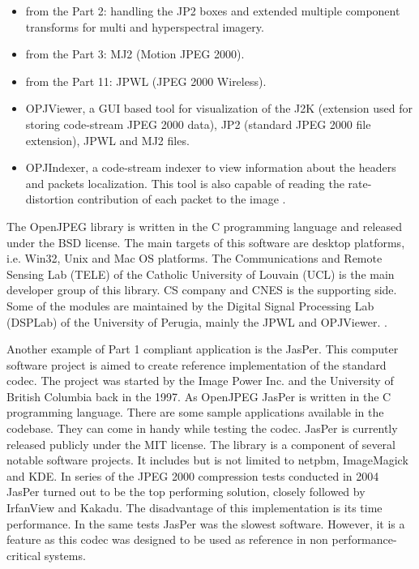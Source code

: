 \begin{itemize}
    \item from the Part 2: handling the JP2 boxes and extended multiple component
    transforms for multi and hyperspectral imagery.
    \item from the Part 3: MJ2 (Motion JPEG 2000).
    \item from the Part 11: JPWL (JPEG 2000 Wireless).
    \item OPJViewer, a GUI based tool for visualization of the J2K (extension used for storing
    code-stream JPEG 2000 data), JP2 (standard JPEG 2000 file extension), JPWL and MJ2 files.
    \item OPJIndexer, a code-stream indexer to view information about the headers and packets localization.
    This tool is also capable of reading the rate-distortion contribution of each packet to the image \cite{jpeg_suite}.
\end{itemize}

The OpenJPEG library is written in the C programming language and released under the BSD license.
The main targets of this software are desktop platforms, i.e. Win32, Unix and Mac OS platforms.
The Communications and Remote Sensing Lab (TELE) of the Catholic University of Louvain (UCL)
is the main developer group of this library. CS company and CNES is the supporting side.
Some of the modules are maintained by the Digital Signal Processing Lab (DSPLab) of the University
of Perugia, mainly the JPWL and OPJViewer. \cite{jpeg_suite}.

Another example of Part 1 compliant application is the JasPer. This computer software project is aimed
to create reference implementation of the standard codec. The project was started by the Image Power Inc.
and the University of British Columbia back in the 1997. As OpenJPEG JasPer is written in the C programming language.
There are some sample applications available in the codebase. They can come in handy while testing the codec. 
JasPer is currently released publicly under the MIT license. The library is a component of several notable
software projects. It includes but is not limited to netpbm, ImageMagick and KDE. In series of the JPEG 2000
compression tests conducted in 2004 JasPer turned out to be the top performing solution, closely followed by
IrfanView and Kakadu. The disadvantage of this implementation is its time performance. In the same tests
JasPer was the slowest software. However, it is a feature as this codec was designed to be used as reference
in non performance-critical systems.

